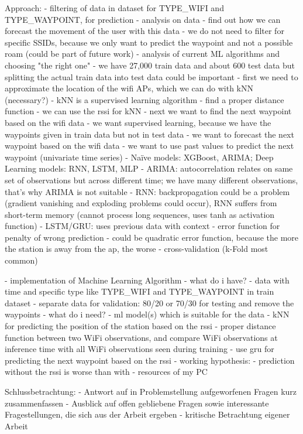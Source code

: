 Approach:
    - filtering of data in dataset for TYPE_WIFI and TYPE_WAYPOINT, for prediction
        - analysis on data
        - find out how we can forecast the movement of the user with this data
        - we do not need to filter for specific SSIDs, because we only want to predict the waypoint and not a possible roam (could be part of future work)
    - analysis of current ML algorithms and choosing "the right one"
        - we have 27,000 train data and about 600 test data but splitting the actual train data into test data could be important
        - first we need to approximate the location of the wifi APs, which we can do with kNN (necessary?)
            - kNN is a supervised learning algorithm
            - find a proper distance function
            - we can use the rssi for kNN
        - next we want to find the next waypoint based on the wifi data 
            - we want supervised learning, because we have the waypoints given in train data but not in test data
                - we want to forecast the next waypoint based on the wifi data
                    - we want to use past values to predict the next waypoint (univariate time series)
                    - Naïve models: XGBoost, ARIMA; Deep Learning models: RNN, LSTM, MLP
                    - ARIMA: autocorrelation relates on same set of observations but across different time; we have many different observations, that's why ARIMA is not suitable
                    - RNN: backpropagation could be a problem (gradient vanishing and exploding problems could occur), RNN suffers from short-term memory (cannot process long sequences, uses tanh as activation function)
                    - LSTM/GRU: uses previous data with context 
        - error function for penalty of wrong prediction
            - could be quadratic error function, because the more the station is away from the ap, the worse 
        - cross-validation (k-Fold most common)

    - implementation of Machine Learning Algorithm
        - what do i have?
            - data with time and specific type like TYPE_WIFI and TYPE_WAYPOINT in train dataset
            - separate data for validation: 80/20 or 70/30 for testing and remove the waypoints
        - what do i need?
            - ml model(s) which is suitable for the data
                - kNN for predicting the position of the station based on the rssi
                    - proper distance function between two WiFi observations, and compare WiFi observations at inference time with all WiFi observations seen during training
                -  use gru for predicting the next waypoint based on the rssi
                - working hypothesis:
                    - prediction without the rssi is worse than with
            - resources of my PC


Schlussbetrachtung:
    - Antwort auf in Problemstellung aufgeworfenen Fragen kurz zusammenfassen
    - Ausblick auf offen gebliebene Fragen sowie interessante Fragestellungen, die sich aus der Arbeit ergeben
    - kritische Betrachtung eigener Arbeit

